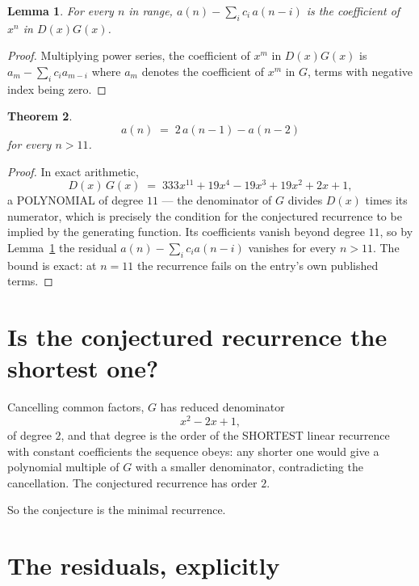 \documentclass[11pt,a4paper]{article}
\theoremstyle{plain}
\newtheorem{theorem}{Theorem}
\newtheorem{lemma}[theorem]{Lemma}
\theoremstyle{definition}
\begin{document}
\begin{lemma}\label{lem:key}
For every $n$ in range, $a(n)-\sum_i c_i\,a(n-i)$ is the coefficient of $x^{n}$ in
$D(x)G(x)$.
\end{lemma}

\begin{proof}
Multiplying power series, the coefficient of $x^{m}$ in $D(x)G(x)$ is
$a_m-\sum_i c_i a_{m-i}$ where $a_m$ denotes the coefficient of $x^{m}$ in $G$, terms with
negative index being zero.
\end{proof}

\begin{theorem}
\[
a(n)\;=\;2\,a(n-1) - a(n-2)
\]
for every $n>11$.
\end{theorem}

\begin{proof}
In exact arithmetic,
\[
D(x)\,G(x)\;=\;333 x^{11} + 19 x^{4} - 19 x^{3} + 19 x^{2} + 2 x + 1,
\]
a POLYNOMIAL of degree $11$ --- the denominator of $G$ divides $D(x)$ times its numerator,
which is precisely the condition for the conjectured recurrence to be implied by the
generating function. Its coefficients vanish beyond degree $11$, so by
Lemma~\ref{lem:key} the residual $a(n)-\sum_ic_ia(n-i)$ vanishes for every
$n>11$. The bound is exact: at $n=11$ the recurrence fails on the entry's own published terms.
\end{proof}

\section{Is the conjectured recurrence the shortest one?}

Cancelling common factors, $G$ has reduced denominator
\[
x^{2} - 2 x + 1,
\]
of degree $2$, and that degree is the order of the SHORTEST linear recurrence with
constant coefficients the sequence obeys: any shorter one would give a polynomial multiple of
$G$ with a smaller denominator, contradicting the cancellation. The conjectured recurrence has
order $2$.

So the conjecture is the minimal recurrence.

\section{The residuals, explicitly}
\end{document}
